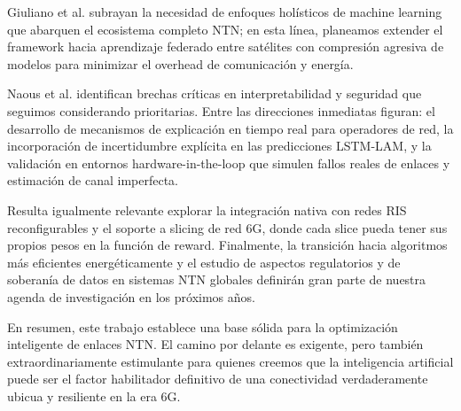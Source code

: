 Giuliano et al. \cite{Giuliano2023} subrayan la necesidad de enfoques holísticos de machine learning que abarquen el ecosistema completo NTN; en esta línea, planeamos extender el framework hacia aprendizaje federado entre satélites con compresión agresiva de modelos para minimizar el overhead de comunicación y energía. 

Naous et al. \cite{Naous2023} identifican brechas críticas en interpretabilidad y seguridad que seguimos considerando prioritarias. Entre las direcciones inmediatas figuran: el desarrollo de mecanismos de explicación en tiempo real para operadores de red, la incorporación de incertidumbre explícita en las predicciones LSTM-LAM, y la validación en entornos hardware-in-the-loop que simulen fallos reales de enlaces y estimación de canal imperfecta.

Resulta igualmente relevante explorar la integración nativa con redes RIS reconfigurables y el soporte a slicing de red 6G, donde cada slice pueda tener sus propios pesos en la función de reward. Finalmente, la transición hacia algoritmos más eficientes energéticamente y el estudio de aspectos regulatorios y de soberanía de datos en sistemas NTN globales definirán gran parte de nuestra agenda de investigación en los próximos años.

En resumen, este trabajo establece una base sólida para la optimización inteligente de enlaces NTN. El camino por delante es exigente, pero también extraordinariamente estimulante para quienes creemos que la inteligencia artificial puede ser el factor habilitador definitivo de una conectividad verdaderamente ubicua y resiliente en la era 6G.